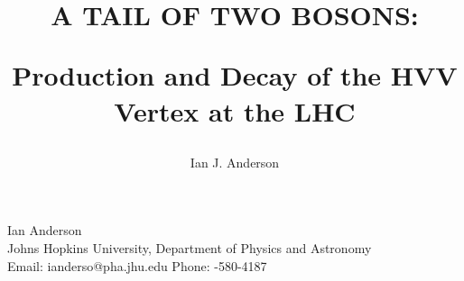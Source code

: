 \documentclass[12pt,oneside,final]{thesis}
\begin{document}
\title{
\begin{Large}
A TAIL OF TWO BOSONS: \\
\end{Large}
Production and Decay of the HVV Vertex at the LHC
}
\author{Ian J. Anderson}
\degreemonth{}
\dissertation
\doctorphilosophy
\copyrightnotice





%





\pagebreak
\begin{cv}{{\large Ian Anderson}\\
    {\normalsize Johns Hopkins University, 
      Department of Physics and Astronomy\\
      Email: ianderso@pha.jhu.edu
      \hfill Phone: {-580-4187} 
    }
}

\end{cv}
\end{document}
